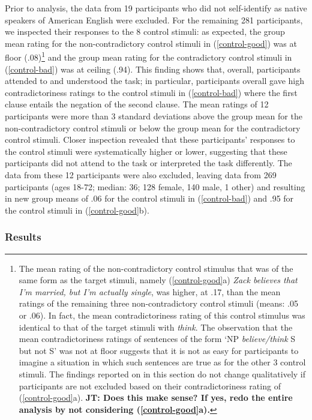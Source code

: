 \documentclass[11pt,fleqn]{article}
\newcommand{\6}{\mbox{$[\hspace*{-.6mm}[$}}
\newcommand{\9}{\mbox{$]\hspace*{-.6mm}]$}}
\newcommand{\jt}[1]{\textbf{\color{blue}JT: #1}}
\begin{document}
{Prior to analysis, the data from 19 participants who did not self-identify as native speakers of American English were excluded. For the remaining 281 participants, we inspected their responses to the 8 control stimuli: as expected, the group mean rating for the non-contradictory control stimuli in (\ref{control-good}) was at floor (.08)\footnote{The mean rating of the non-contradictory control stimulus that was of the same form as the target stimuli, namely (\ref{control-good}a) {\em Zack believes that I'm married, but I'm actually single}, was higher, at .17, than the mean ratings of the remaining three non-contradictory control stimuli (means: .05 or .06). In fact, the mean contradictoriness rating of this control stimulus was identical to that of the target stimuli with {\em think}. The observation that the mean contradictoriness ratings of sentences of the form `NP {\em believe/think} S but not S' was not at floor suggests that it is not as easy for participants to imagine a situation in which such sentences are true as for the other 3 control stimuli. The findings reported on in this section do not change qualitatively if participants are not excluded based on their contradictoriness rating of (\ref{control-good}a). \jt{Does this make sense? If yes, redo the entire analysis by not considering (\ref{control-good}a).}}  and the group mean rating for the contradictory control stimuli in (\ref{control-bad}) was at ceiling (.94). This finding shows that, overall, participants attended to and understood the task; in particular, participants overall gave high contradictoriness ratings to the control stimuli in (\ref{control-bad}) where the first clause entails the negation of the second clause. The mean ratings of 12 participants were more than 3 standard deviations above the group mean for the non-contradictory control stimuli or below the group mean for the contradictory control stimuli. Closer inspection revealed that these participants' responses to the control stimuli were systematically higher or lower, suggesting that these participants did not attend to the task or interpreted the task differently. The data from these 12 participants were also excluded, leaving data from 269 participants (ages 18-72; median: 36; 128 female, 140 male, 1 other) and resulting in new group means of .06 for the control stimuli in (\ref{control-bad}) and .95 for the control stimuli in (\ref{control-good}b). 

\subsubsection{Results}

}
\end{document}
